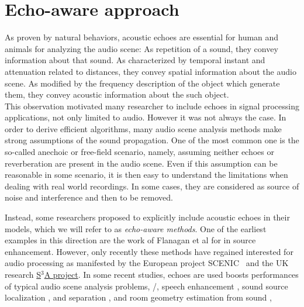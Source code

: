 \section{Echo-aware approach}
As proven by natural behaviors, acoustic echoes are essential for human and animals for analyzing the audio scene:
As repetition of a sound, they convey information about that sound.
As characterized by temporal instant and attenuation related to distances, they convey spatial information about the audio scene.
As modified by the frequency description of the object which generate them, they convey acoustic information about the such object.
\\This observation motivated many researcher to include echoes in signal processing applications, not only limited to audio.
However it was not always the case.
In order to derive efficient algorithms, many audio scene analysis methods make strong assumptions of the sound propagation.
One of the most common one is the so-called anechoic or free-field scenario, namely, assuming neither echoes or reverberation are present in the audio scene.
Even if this assumption can be reasonable in some scenario, it is then easy to understand the limitations when dealing with real world recordings.
In some cases, they are considered as source of noise and interference and then to be removed.


\mynewline
Instead, some researchers proposed to explicitly include acoustic echoes in their models, which we will refer to as \textit{echo-aware methods}.
One of the earliest examples in this direction are the work of Flanagan et al for in source enhancement.
However, only recently these methods have regained interested for audio processing as manifested by the European project SCENIC~ and the UK research \href{http://www.s3a-spatialaudio.org/}{S$^3$A project}.
In some recent studies, echoes are used boosts performances of typical audio scene analysis problems, \eg/, speech enhancement , sound source localization , and separation , and room geometry estimation from sound ,

